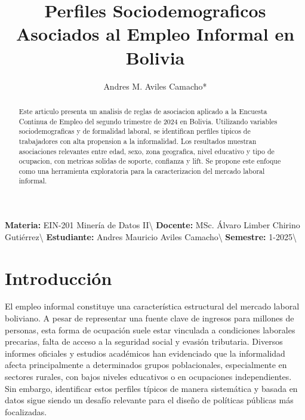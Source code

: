 \documentclass[Royal,times,sageh]{sagej}
\begin{document}

\title{Perfiles Sociodemograficos Asociados al Empleo Informal en
Bolivia}


\author{Andres M. Aviles Camacho*}




\begin{abstract}
Este articulo presenta un analisis de reglas de asociacion aplicado a la
Encuesta Continua de Empleo del segundo trimestre de 2024 en Bolivia.
Utilizando variables sociodemograficas y de formalidad laboral, se
identifican perfiles tipicos de trabajadores con alta propension a la
informalidad. Los resultados muestran asociaciones relevantes entre
edad, sexo, zona geografica, nivel educativo y tipo de ocupacion, con
metricas solidas de soporte, confianza y lift. Se propone este enfoque
como una herramienta exploratoria para la caracterizacion del mercado
laboral informal.
\end{abstract}


\maketitle

\bigskip

\noindent\textbf{Materia:} EIN-201 Minería de Datos II\textbackslash{}
\textbf{Docente:} MSc. Álvaro Limber Chirino Gutiérrez\textbackslash{}
\textbf{Estudiante:} Andres Mauricio Aviles Camacho\textbackslash{}
\textbf{Semestre:} 1-2025\textbackslash{}

\bigskip

\newpage

\section{Introducción}\label{introducciuxf3n}

El empleo informal constituye una característica estructural del mercado
laboral boliviano. A pesar de representar una fuente clave de ingresos
para millones de personas, esta forma de ocupación suele estar vinculada
a condiciones laborales precarias, falta de acceso a la seguridad social
y evasión tributaria. Diversos informes oficiales y estudios académicos
han evidenciado que la informalidad afecta principalmente a determinados
grupos poblacionales, especialmente en sectores rurales, con bajos
niveles educativos o en ocupaciones independientes. Sin embargo,
identificar estos perfiles típicos de manera sistemática y basada en
datos sigue siendo un desafío relevante para el diseño de políticas
públicas más focalizadas.
\end{document}
